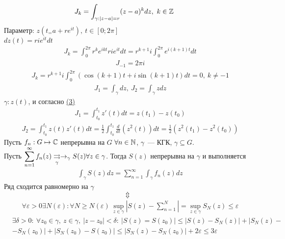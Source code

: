 \example
\begin{align*}
  &J_k = \int_{\gamma: \left| z-a \right| = r} (z-a)^k dz, \ k \in \mathbb{Z}
\end{align*}
Параметр: $z(t_ = a+re^{it}), \ t \in [0;2\pi]$
\\
$dz(t) = rie^{it}dt$
\begin{align*}
  &J_k = \int_{0}^{2\pi} r^ke^{ikt}rie^{it}dt = r^{k+1}i\int_{0}^{2\pi}e^{i(k+1)t} dt
\end{align*}
\begin{align*}
  &J_{-1} = 2 \pi i
\end{align*}
\begin{align*}
  &J_k = r^{k+1}i\int_{0}^{2\pi} \left( \cos(k+1)t + i \sin(k+1)t \right) dt = 0, \ k \neq -1
\end{align*}
\example
\begin{align*}
  &J_1 = \int_{\gamma} dz, \ J_2 = \int_{\gamma}z dz
\end{align*}
$\gamma: z(t)$, и согласно \hyperlink{(3)}{(3)}
\begin{align*}
  &J_1 = \int_{t_0}^{t_1} z'(t)dt = z(t_1) - z(t_0)
\end{align*}
\begin{align*}
  &J_2 = \int_{t_0}^{t_1} z(t)z'(t)dt = \frac{1}{2}\int_{t_0}^{t_1}\frac{d}{dt}\left( z^2(t) \right)dt = \frac{1}{2}\left( z^2(t_1) - z^2(t_0) \right)
\end{align*}
\theorem
Пусть $f_n: G \mapsto \mathbb{C}$ непрерывна на $G$ $\forall n \in \mathbb{N}$, $\gamma$~---
КГК, $\gamma \subseteq G$.
\\
Пусть $\displaystyle \sum_{n=1}^{\infty}f_n(z) \underset{\gamma}{\rightrightarrows} \rightarrow_{\gamma} S(z)
\forall z \in \gamma$.
Тогда $S(z)$ непрерывна на $\gamma$ \hypertarget{(6)}{и выполняется}
\begin{align}
  &\int_{\gamma}S(z) dz = \sum_{n=1}^{\infty}\int_{\gamma}f_n(z)dz
\end{align}
\pr
Ряд сходится равномерно на $\gamma$
\\
$$\Updownarrow$$
\begin{align}
  &\forall \varepsilon > 0 \exists N(\varepsilon): \forall N\geq N(\varepsilon) \ \underset{z \in \gamma}{\sup} \left| S(z) - \sum_{n = 1}^{N} \right| = \underset{z \in \gamma}{\sup} S_N(z) \leq \varepsilon
\end{align}
\begin{align*}
  &\exists \delta > 0: \ \forall z_0 \in \gamma, \ z \in \gamma, \ \left| z - z_0 \right| < \delta: \ \left| S(z) = S(z_0) \right| \leq \left| S(z) - S_N(z) \right| +  \left| S_N(z) - \right. \\
  &\left. - S_N(z_0) \right| + \left| S_N(z_0) - S(z_0) \right| \leq \left| S_N(z) - S_N(z_0) \right| + 2 \varepsilon \leq 3 \varepsilon
\end{align*}
